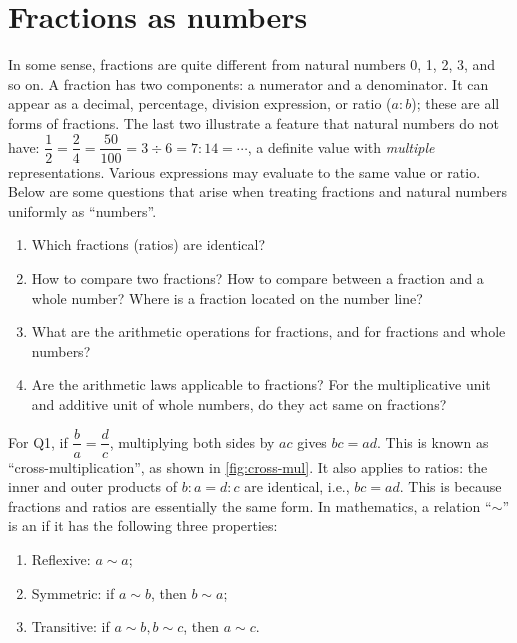 \documentclass[b5paper]{article}
\begin{document}
\section{Fractions as numbers}
In some sense, fractions are quite different from natural numbers 0, 1, 2, 3, and so on. A fraction has two components: a numerator and a denominator. It can appear as a decimal, percentage, division expression, or ratio ($a:b$); these are all forms of fractions. The last two illustrate a feature that natural numbers do not have: $\dfrac{1}{2} = \dfrac{2}{4} = \dfrac{50}{100} = 3 \div 6 = 7:14 = \cdots$, a definite value with \emph{multiple} representations. Various expressions may evaluate to the same value or ratio. Below are some questions that arise when treating fractions and natural numbers uniformly as \enquote{numbers}.

\begin{enumerate}[Q1.]
\item Which fractions (ratios) are identical?
\item How to compare two fractions? How to compare between a fraction and a whole number? Where is a fraction located on the number line?
\item What are the arithmetic operations for fractions, and for fractions and whole numbers?
\item Are the arithmetic laws applicable to fractions? For the multiplicative unit and additive unit of whole numbers, do they act same on fractions?
\end{enumerate}

 \label{sec:frac-equiv}
For Q1, if $\dfrac{b}{a} = \dfrac{d}{c}$, multiplying both sides by $ac$ gives $bc = ad$. This is known as \enquote{cross-multiplication}, as shown in \cref{fig:cross-mul}. It also applies to ratios: the inner and outer products of $b:a=d:c$ are identical, i.e., $bc=ad$. This is because fractions and ratios are essentially the same form. In mathematics, a relation \enquote{$\sim$} is an  if it has the following three properties:

\begin{enumerate}[P1.]
\item Reflexive: $a \sim a$;
\item Symmetric: if $a \sim b$, then $b \sim a$;
\item Transitive: if $a \sim b, b \sim c$, then $a \sim c$.
\end{enumerate}
\end{document}
